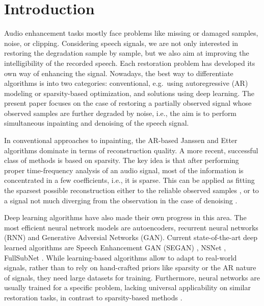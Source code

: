 \documentclass[conference]{IEEEtran}
\begin{document}
\section{Introduction}

Audio enhancement tasks mostly face problems like missing or damaged samples, noise, or clipping.
Considering speech signals, we %
are not only interested in restoring the degradation sample by sample, but we also aim at improving the intelligibility of the recorded speech.
Each restoration problem has developed its own way of enhancing the signal.
Nowadays, the best way to differentiate algorithms is into two categories:
conventional, e.g.\ using autoregressive (AR) modeling or sparsity-based optimization, and solutions using deep learning.
The present paper focuses on the case of restoring a partially observed signal whose observed samples are further degraded by noise, i.e., the aim is to perform simultaneous inpainting and denoising of the speech signal.

In conventional approaches to inpainting, the AR-based Janssen \cite{Janssen1986} and Etter~\cite{Etter1996} algorithms dominate in terms of reconstruction quality.
A more recent, successful class of methods is based on sparsity.
The key idea is that after performing proper time-frequency analysis of an audio signal,
most of the information is concentrated in a few coefficients, i.e., it is sparse.
This can be applied as fitting the sparsest possible reconstruction either to the reliable observed samples \cite{Adler2012, Kitic2015, Zaviska2019, Mokry2019}, or to a signal not much diverging from the observation in the case of denoising \cite{Kowalski2013}.

Deep learning algorithms have also made their own progress in this area.
The most efficient neural network models are autoencoders,
recurrent neural networks (RNN) and
Generative Adversial Networks (GAN).
Current state-of-the-art deep learned algorithms are Speech Enhancement GAN (SEGAN) \cite{Pascual2017}, NSNet \cite{Xia2020}, FullSubNet \cite{Hao2021}.
While learning-based algorithms allow to adapt to real-world signals, rather than to rely on hand-crafted priors like sparsity or the AR nature of signals, they need large datasets for training.
Furthermore, neural networks are usually trained for a specific problem, lacking universal applicability on similar restoration tasks, in contrast to sparsity-based methods \cite{Gaultier2017, Mokry202021, Zaviska2021}.
\end{document}
